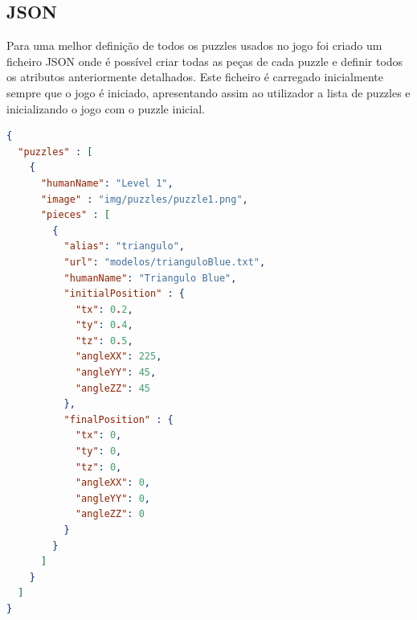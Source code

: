 \documentclass[pdftex,12pt,a4paper]{report}
\begin{document}
\subsection{JSON}

Para uma melhor definição de todos os puzzles usados no jogo foi criado um ficheiro JSON onde é possível criar todas as peças de cada puzzle e definir todos os atributos anteriormente detalhados. Este ficheiro é carregado inicialmente sempre que o jogo é iniciado, apresentando assim ao utilizador a lista de puzzles e inicializando o jogo com o puzzle inicial.

\begin{lstlisting}[language=json,firstnumber=1]
{
  "puzzles" : [
    {
      "humanName": "Level 1",
      "image" : "img/puzzles/puzzle1.png",
      "pieces" : [
        {
          "alias": "triangulo",
          "url": "modelos/trianguloBlue.txt",
          "humanName": "Triangulo Blue",
          "initialPosition" : {
            "tx": 0.2,
            "ty": 0.4,
            "tz": 0.5,
            "angleXX": 225,
            "angleYY": 45,
            "angleZZ": 45
          },
          "finalPosition" : {
            "tx": 0,
            "ty": 0,
            "tz": 0,
            "angleXX": 0,
            "angleYY": 0,
            "angleZZ": 0
          }
        }
      ]
    }
  ]
}
\end{lstlisting}
\end{document}
